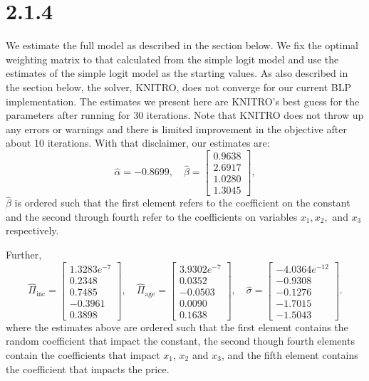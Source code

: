\documentclass[a4paper,11pt]{article}
\begin{document}
\section*{2.1.4}
We estimate the full model as described in the section below. We fix the optimal weighting matrix to that calculated from the simple logit model and use the estimates of the simple logit model as the starting values. As also described in the section below, the solver, KNITRO, does not converge for our current BLP implementation. The estimates we present here are KNITRO's best guess for the parameters after running for 30 iterations. Note that KNITRO does not throw up any errors or warnings and there is limited improvement in the objective after about 10 iterations. With that disclaimer, our estimates are:
\[
\hat\alpha = -0.8699, \quad
\hat\beta = \left[ \begin{array}{r} 
0.9638 \\ 2.6917 \\ 1.0280 \\ 1.3045
\end{array}\right],
\]
$\hat\beta$ is ordered such that the first element refers to the coefficient on the constant and the second through fourth refer to the coefficients on variables $x_1, x_2,$ and $x_3$ respectively.

\noindent Further,
\[
\hat\Pi_{\mathrm{inc}} = \left[ \begin{array}{r}
1.3283e^{-7} \\ 0.2348 \\ 0.7485 \\ -0.3961 \\ 0.3898
\end{array}\right],
\quad
\hat\Pi_{\mathrm{age}} = \left[ \begin{array}{r}
3.9302e^{-7} \\ 0.0352 \\ -0.0503 \\ 0.0090 \\ 0.1638
\end{array}\right],
\quad
\hat\sigma = \left[ \begin{array}{r}
-4.0364e^{-12} \\ -0.9308 \\ -0.1276 \\ -1.7015 \\ -1.5043
\end{array}\right].
\]
where the estimates above are ordered such that the first element contains the random coefficient that impact the constant, the second though fourth elements contain the coefficients that impact $x_1$, $x_2$ and $x_3$, and the fifth element contains the coefficient that impacts the price.
\end{document}
